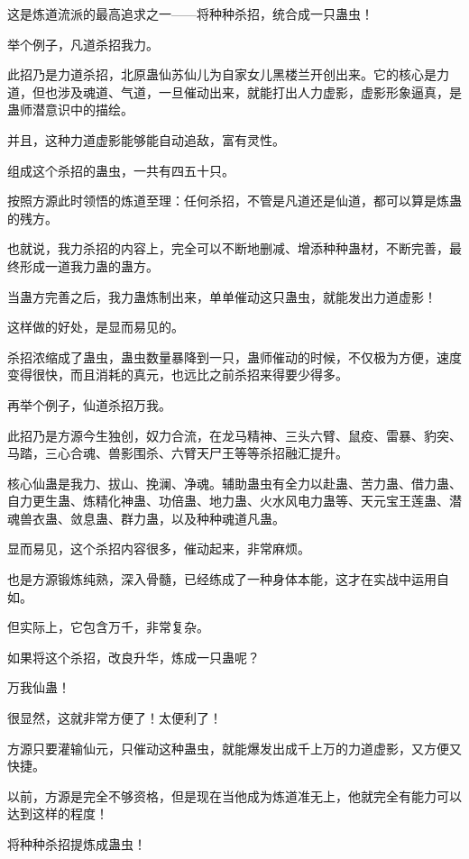 
\begin{this_body}

这是炼道流派的最高追求之一——将种种杀招，统合成一只蛊虫！

举个例子，凡道杀招我力。

此招乃是力道杀招，北原蛊仙苏仙儿为自家女儿黑楼兰开创出来。它的核心是力道，但也涉及魂道、气道，一旦催动出来，就能打出人力虚影，虚影形象逼真，是蛊师潜意识中的描绘。

并且，这种力道虚影能够能自动追敌，富有灵性。

组成这个杀招的蛊虫，一共有四五十只。

按照方源此时领悟的炼道至理：任何杀招，不管是凡道还是仙道，都可以算是炼蛊的残方。

也就说，我力杀招的内容上，完全可以不断地删减、增添种种蛊材，不断完善，最终形成一道我力蛊的蛊方。

当蛊方完善之后，我力蛊炼制出来，单单催动这只蛊虫，就能发出力道虚影！

这样做的好处，是显而易见的。

杀招浓缩成了蛊虫，蛊虫数量暴降到一只，蛊师催动的时候，不仅极为方便，速度变得很快，而且消耗的真元，也远比之前杀招来得要少得多。

再举个例子，仙道杀招万我。

此招乃是方源今生独创，奴力合流，在龙马精神、三头六臂、鼠疫、雷暴、豹突、马踏，三心合魂、兽影围杀、六臂天尸王等等杀招融汇提升。

核心仙蛊是我力、拔山、挽澜、净魂。辅助蛊虫有全力以赴蛊、苦力蛊、借力蛊、自力更生蛊、炼精化神蛊、功倍蛊、地力蛊、火水风电力蛊等、天元宝王莲蛊、潜魂兽衣蛊、敛息蛊、群力蛊，以及种种魂道凡蛊。

显而易见，这个杀招内容很多，催动起来，非常麻烦。

也是方源锻炼纯熟，深入骨髓，已经练成了一种身体本能，这才在实战中运用自如。

但实际上，它包含万千，非常复杂。

如果将这个杀招，改良升华，炼成一只蛊呢？

万我仙蛊！

很显然，这就非常方便了！太便利了！

方源只要灌输仙元，只催动这种蛊虫，就能爆发出成千上万的力道虚影，又方便又快捷。

以前，方源是完全不够资格，但是现在当他成为炼道准无上，他就完全有能力可以达到这样的程度！

将种种杀招提炼成蛊虫！


\end{this_body}
